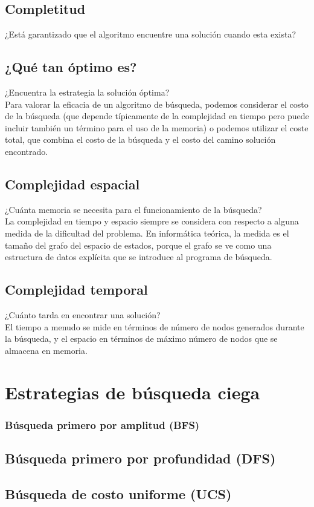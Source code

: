 \documentclass[12pt,a4paper]{report}
\begin{document}
\subsection*{Completitud}
¿Está garantizado que el algoritmo encuentre una solución cuando esta exista?
\subsection*{¿Qué tan óptimo es?}
¿Encuentra la estrategia la solución óptima?\\Para valorar la eficacia de un algoritmo de búsqueda, podemos considerar el costo de la búsqueda (que depende típicamente de la complejidad en tiempo pero puede incluir también un término para el uso de la memoria) o podemos utilizar el coste total, que combina el costo de la búsqueda y el costo del camino solución encontrado.
\subsection*{Complejidad espacial}
¿Cuánta memoria se necesita para el funcionamiento de la búsqueda?\\La complejidad en tiempo y espacio siempre se considera con respecto a alguna medida de la dificultad del problema. En informática teórica, la medida es el tamaño del grafo del espacio de estados, porque el grafo se ve como una estructura de datos explícita que se introduce al programa de búsqueda.
\subsection*{Complejidad temporal}
¿Cuánto tarda en encontrar una solución?\\El tiempo a menudo se mide en términos de número de nodos generados durante la búsqueda, y el espacio en términos de máximo número de nodos que se almacena en memoria.
\section{Estrategias de búsqueda ciega}
\subsubsection*{Búsqueda primero por amplitud (BFS)}
\subsection*{Búsqueda primero por profundidad (DFS)}
\subsection*{Búsqueda de costo uniforme (UCS)}
\end{document}
